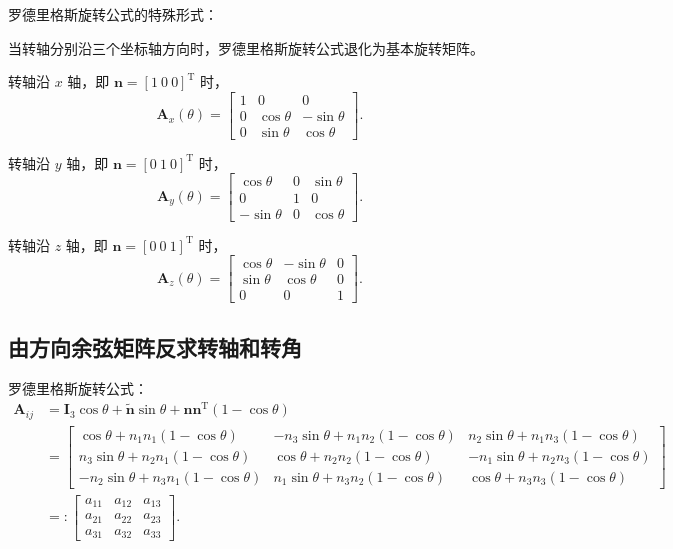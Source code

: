 罗德里格斯旋转公式的特殊形式：

\begin{property}[基本旋转矩阵]\label{prop:basic-rotation}
	当转轴分别沿三个坐标轴方向时，罗德里格斯旋转公式退化为基本旋转矩阵。

	转轴沿 $x$ 轴，即 $\boldsymbol{n}=[1\ 0\ 0]^{\mathrm{T}}$ 时，
	$$
	\boldsymbol{A}_x(\theta)=\begin{bmatrix}1&0&0\\0&\cos\theta&-\sin\theta\\0&\sin\theta&\cos\theta\end{bmatrix}.
	$$

	转轴沿 $y$ 轴，即 $\boldsymbol{n}=[0\ 1\ 0]^{\mathrm{T}}$ 时，
	$$
	\boldsymbol{A}_y(\theta)=\begin{bmatrix}\cos\theta&0&\sin\theta\\0&1&0\\-\sin\theta&0&\cos\theta\end{bmatrix}.
	$$

	转轴沿 $z$ 轴，即 $\boldsymbol{n}=[0\ 0\ 1]^{\mathrm{T}}$ 时，
	$$
	\boldsymbol{A}_z(\theta)=\begin{bmatrix}\cos\theta&-\sin\theta&0\\\sin\theta&\cos\theta&0\\0&0&1\end{bmatrix}.
	$$
\end{property}

\subsection{由方向余弦矩阵反求转轴和转角}
罗德里格斯旋转公式：
$$\begin{aligned}
	\boldsymbol{A}_{i j} & =\boldsymbol{I}_{3} \cos \theta+\tilde{\boldsymbol{n}} \sin \theta+\boldsymbol{n} \boldsymbol{n}^{\mathrm{T}}(1-\cos \theta) \\
	& =\left[\begin{array}{rrr}
		\cos \theta+n_{1} n_{1}(1-\cos \theta) & -n_{3} \sin \theta+n_{1} n_{2}(1-\cos \theta) & n_{2} \sin \theta+n_{1} n_{3}(1-\cos \theta) \\
		n_{3} \sin \theta+n_{2} n_{1}(1-\cos \theta) & \cos \theta+n_{2} n_{2}(1-\cos \theta) & -n_{1} \sin \theta+n_{2} n_{3}(1-\cos \theta) \\
		-n_{2} \sin \theta+n_{3} n_{1}(1-\cos \theta) & n_{1} \sin \theta+n_{3} n_{2}(1-\cos \theta) & \cos \theta+n_{3} n_{3}(1-\cos \theta)
	\end{array}\right] \\
	& =:\left[\begin{array}{lll}
		a_{11} & a_{12} & a_{13} \\
		a_{21} & a_{22} & a_{23} \\
		a_{31} & a_{32} & a_{33}
	\end{array}\right] .
\end{aligned}$$

